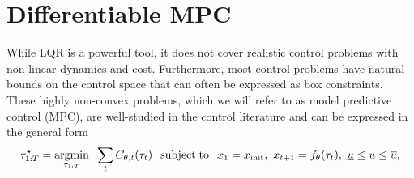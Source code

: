 \section{Differentiable MPC}
\label{sec:empc:diff-mpc}

While LQR is a powerful tool, it does not cover
realistic control problems with non-linear
dynamics and cost.
Furthermore, most control problems have natural bounds on the
control space that can often be expressed as box constraints.
These highly non-convex problems, which we will refer to as
model predictive control (MPC), are well-studied in the
control literature and can be expressed in the general form
\begin{equation}
  \label{eq:empc:ilqr}
    \tau_{1:T}^{\star} = \operatorname*{argmin}_{\tau_{1:T}}\;\; \sum_tC_{\theta,t}(\tau_t) \;\;
    \operatorname*{subject\;to}\;\;
    x_1 = x_{\rm init}, \
    x_{t+1} = f_\theta(\tau_t), \
    \underline{u} \leq u \leq \overline{u},
\end{equation}

